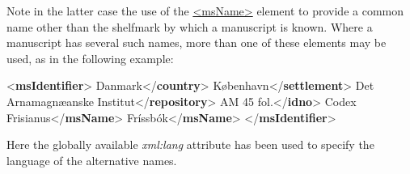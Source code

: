 Note in the latter case the use of the \hyperref[TEI.msName]{<msName>} element to provide a common name other than the shelfmark by which a manuscript is known. Where a manuscript has several such names, more than one of these elements may be used, as in the following example: \par\bgroup{}\exampleFont \begin{shaded}\noindent\mbox{}{<\textbf{msIdentifier}>}\mbox{}\newline 
{}Danmark{</\textbf{country}>}\mbox{}\newline 
{}København{</\textbf{settlement}>}\mbox{}\newline 
{}Det Arnamagnæanske Institut{</\textbf{repository}>}\mbox{}\newline 
{}AM 45 fol.{</\textbf{idno}>}\mbox{}\newline 
{}Codex Frisianus{</\textbf{msName}>}\mbox{}\newline 
{}Fríssbók{</\textbf{msName}>}\mbox{}\newline 
{</\textbf{msIdentifier}>}\end{shaded}\egroup\par \noindent  Here the globally available {\itshape xml:lang} attribute has been used to specify the language of the alternative names. \par
